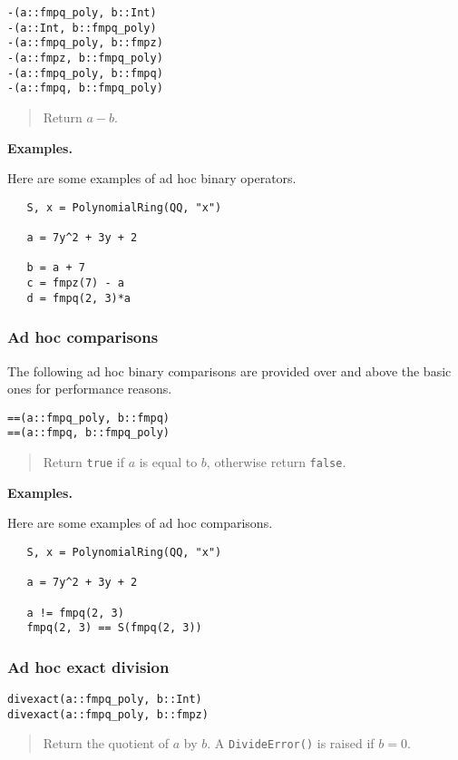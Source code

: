 \documentclass[a4paper,10pt]{article}
\newcommand{\code}{\lstinline}
\newcommand{\desc}[1]{\vspace{-3mm}\begin{quote}#1\end{quote}}
\begin{document}
{{\begin{lstlisting}
-(a::fmpq_poly, b::Int)
-(a::Int, b::fmpq_poly)
-(a::fmpq_poly, b::fmpz)
-(a::fmpz, b::fmpq_poly)
-(a::fmpq_poly, b::fmpq)
-(a::fmpq, b::fmpq_poly)
\end{lstlisting}

\desc{Return $a - b$.}

\textbf{Examples.}

Here are some examples of ad hoc binary operators.

\begin{lstlisting}
   S, x = PolynomialRing(QQ, "x")

   a = 7y^2 + 3y + 2

   b = a + 7
   c = fmpz(7) - a
   d = fmpq(2, 3)*a
\end{lstlisting}

\subsubsection{Ad hoc comparisons}

The following ad hoc binary comparisons are provided over and above the basic ones
for performance reasons.

\begin{lstlisting}
==(a::fmpq_poly, b::fmpq)
==(a::fmpq, b::fmpq_poly)
\end{lstlisting}

\desc{Return \code{true} if $a$ is equal to $b$, otherwise return \code{false}.}

\textbf{Examples.}

Here are some examples of ad hoc comparisons.

\begin{lstlisting}
   S, x = PolynomialRing(QQ, "x")

   a = 7y^2 + 3y + 2

   a != fmpq(2, 3)
   fmpq(2, 3) == S(fmpq(2, 3))
\end{lstlisting}

\subsubsection{Ad hoc exact division}

\begin{lstlisting}
divexact(a::fmpq_poly, b::Int)
divexact(a::fmpq_poly, b::fmpz)
\end{lstlisting}

\desc{Return the quotient of $a$ by $b$. A \code{DivideError()} is raised if $b = 0$.}

}}
\end{document}
